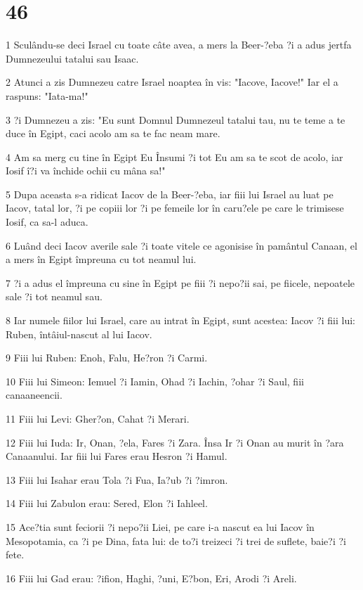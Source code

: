 \chapter{46}

\par 1 Sculându-se deci Israel cu toate câte avea, a mers la Beer-?eba ?i a adus jertfa Dumnezeului tatalui sau Isaac.
\par 2 Atunci a zis Dumnezeu catre Israel noaptea în vis: "Iacove, Iacove!" Iar el a raspuns: "Iata-ma!"
\par 3 ?i Dumnezeu a zis: "Eu sunt Domnul Dumnezeul tatalui tau, nu te teme a te duce în Egipt, caci acolo am sa te fac neam mare.
\par 4 Am sa merg cu tine în Egipt Eu Însumi ?i tot Eu am sa te scot de acolo, iar Iosif î?i va închide ochii cu mâna sa!"
\par 5 Dupa aceasta s-a ridicat Iacov de la Beer-?eba, iar fiii lui Israel au luat pe Iacov, tatal lor, ?i pe copiii lor ?i pe femeile lor în caru?ele pe care le trimisese Iosif, ca sa-l aduca.
\par 6 Luând deci Iacov averile sale ?i toate vitele ce agonisise în pamântul Canaan, el a mers în Egipt împreuna cu tot neamul lui.
\par 7 ?i a adus el împreuna cu sine în Egipt pe fiii ?i nepo?ii sai, pe fiicele, nepoatele sale ?i tot neamul sau.
\par 8 Iar numele fiilor lui Israel, care au intrat în Egipt, sunt acestea: Iacov ?i fiii lui: Ruben, întâiul-nascut al lui Iacov.
\par 9 Fiii lui Ruben: Enoh, Falu, He?ron ?i Carmi.
\par 10 Fiii lui Simeon: Iemuel ?i Iamin, Ohad ?i Iachin, ?ohar ?i Saul, fiii canaaneencii.
\par 11 Fiii lui Levi: Gher?on, Cahat ?i Merari.
\par 12 Fiii lui Iuda: Ir, Onan, ?ela, Fares ?i Zara. Însa Ir ?i Onan au murit în ?ara Canaanului. Iar fiii lui Fares erau Hesron ?i Hamul.
\par 13 Fiii lui Isahar erau Tola ?i Fua, Ia?ub ?i ?imron.
\par 14 Fiii lui Zabulon erau: Sered, Elon ?i Iahleel.
\par 15 Ace?tia sunt feciorii ?i nepo?ii Liei, pe care i-a nascut ea lui Iacov în Mesopotamia, ca ?i pe Dina, fata lui: de to?i treizeci ?i trei de suflete, baie?i ?i fete.
\par 16 Fiii lui Gad erau: ?ifion, Haghi, ?uni, E?bon, Eri, Arodi ?i Areli.
